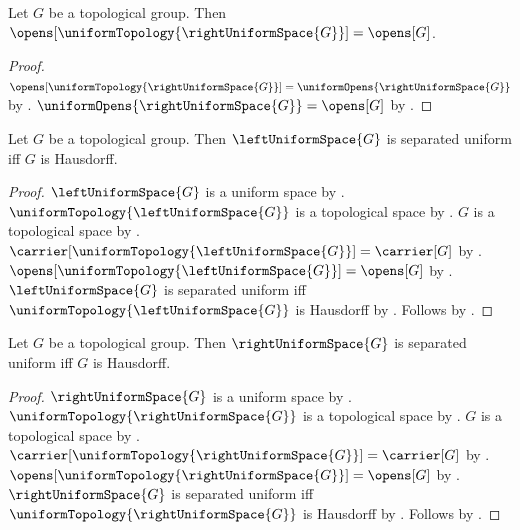 \begin{theorem}\label{right_uniform_topology_opens}
    Let $G$ be a topological group.
    Then $\opens[\uniformTopology{\rightUniformSpace{G}}]=\opens[G]$.
\end{theorem}
\begin{proof}
    $\opens[\uniformTopology{\rightUniformSpace{G}}]
        =\uniformOpens{\rightUniformSpace{G}}$
        by .
    $\uniformOpens{\rightUniformSpace{G}}=\opens[G]$
        by .
\end{proof}

\begin{theorem}\label{left_uniform_space_separated_iff_hausdorff}
    Let $G$ be a topological group.
    Then $\leftUniformSpace{G}$ is separated uniform iff $G$ is Hausdorff.
\end{theorem}
\begin{proof}
    $\leftUniformSpace{G}$ is a uniform space
        by .
    $\uniformTopology{\leftUniformSpace{G}}$ is a topological space
        by .
    $G$ is a topological space
        by .
    $\carrier[\uniformTopology{\leftUniformSpace{G}}]=\carrier[G]$
        by .
    $\opens[\uniformTopology{\leftUniformSpace{G}}]=\opens[G]$
        by .
    $\leftUniformSpace{G}$ is separated uniform iff
        $\uniformTopology{\leftUniformSpace{G}}$ is Hausdorff
        by .
    Follows by .
\end{proof}

\begin{theorem}\label{right_uniform_space_separated_iff_hausdorff}
    Let $G$ be a topological group.
    Then $\rightUniformSpace{G}$ is separated uniform iff $G$ is Hausdorff.
\end{theorem}
\begin{proof}
    $\rightUniformSpace{G}$ is a uniform space
        by .
    $\uniformTopology{\rightUniformSpace{G}}$ is a topological space
        by .
    $G$ is a topological space
        by .
    $\carrier[\uniformTopology{\rightUniformSpace{G}}]=\carrier[G]$
        by .
    $\opens[\uniformTopology{\rightUniformSpace{G}}]=\opens[G]$
        by .
    $\rightUniformSpace{G}$ is separated uniform iff
        $\uniformTopology{\rightUniformSpace{G}}$ is Hausdorff
        by .
    Follows by .
\end{proof}

